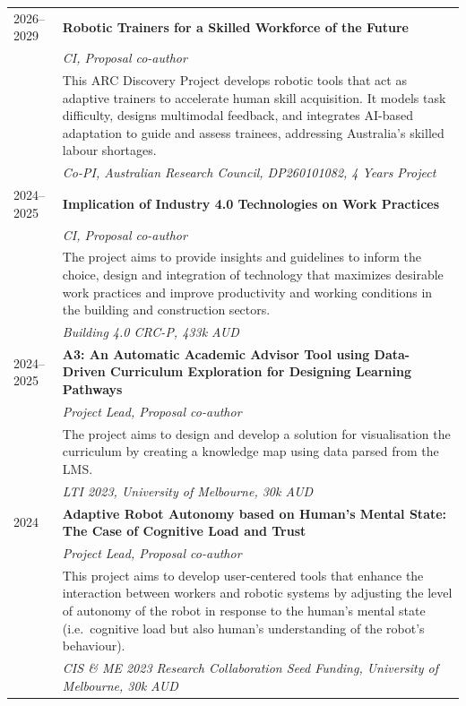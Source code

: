 \begin{longtable}{@{}lp{\dimexpr\textwidth-2.8cm\relax}@{}}
2026--2029 & \textbf{Robotic Trainers for a Skilled Workforce of the Future} \\
           & \emph{CI, Proposal co-author} \\
           & This ARC Discovery Project develops robotic tools that act as adaptive trainers to accelerate human skill acquisition. It models task difficulty, designs multimodal feedback, and integrates AI-based adaptation to guide and assess trainees, addressing Australia's skilled labour shortages. \\
           & \textit{Co-PI, Australian Research Council, DP260101082, 4 Years Project} \\[3pt]

2024--2025 & \textbf{Implication of Industry 4.0 Technologies on Work Practices} \\
           & \emph{CI, Proposal co-author} \\
           & The project aims to provide insights and guidelines to inform the choice, design and integration of technology that maximizes desirable work practices and improve productivity and working conditions in the building and construction sectors. \\
           & \textit{Building 4.0 CRC-P, 433k AUD} \\[3pt]

2024--2025 & \textbf{A3: An Automatic Academic Advisor Tool using Data-Driven Curriculum Exploration for Designing Learning Pathways} \\
           & \emph{Project Lead, Proposal co-author} \\
           & The project aims to design and develop a solution for visualisation the curriculum by creating a knowledge map using data parsed from the LMS. \\
           & \textit{LTI 2023, University of Melbourne, 30k AUD} \\[3pt]

2024       & \textbf{Adaptive Robot Autonomy based on Human's Mental State: The Case of Cognitive Load and Trust} \\
           & \emph{Project Lead, Proposal co-author} \\
           & This project aims to develop user-centered tools that enhance the interaction between workers and robotic systems by adjusting the level of autonomy of the robot in response to the human's mental state (i.e.\ cognitive load but also human's understanding of the robot's behaviour). \\
           & \textit{CIS \& ME 2023 Research Collaboration Seed Funding, University of Melbourne, 30k AUD} \\[3pt]


\end{longtable}
